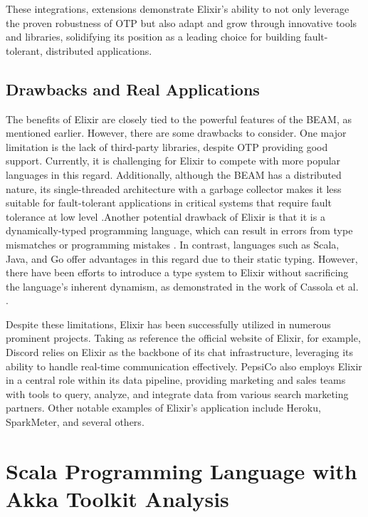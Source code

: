 These integrations, extensions  demonstrate Elixir’s ability to not only leverage the proven robustness of \gls{OTP} but also adapt and grow through innovative tools and libraries, solidifying its position as a leading choice for building fault-tolerant, distributed applications.

\subsection{Drawbacks and Real Applications}

The benefits of Elixir are closely tied to the powerful features of the \gls{BEAM}, as mentioned earlier. However, there are some drawbacks to consider. One major limitation is the lack of third-party libraries, despite \gls{OTP} providing good support. Currently, it is challenging for Elixir to compete with more popular languages in this regard. Additionally, although the \gls{BEAM} has a distributed nature, its single-threaded architecture with a garbage collector makes it less suitable for fault-tolerant applications in critical systems that require fault tolerance at low level \cite{Juric2024}.Another potential drawback of Elixir is that it is a dynamically-typed programming language, which can result in errors from type mismatches or programming mistakes \cite{Cassola2020}. In contrast, languages such as Scala, Java, and Go offer advantages in this regard due to their static typing. However, there have been efforts to introduce a type system to Elixir without sacrificing the language's inherent dynamism, as demonstrated in the work of Cassola et al. \cite{Cassola2020}.

Despite these limitations, Elixir has been successfully utilized in numerous prominent projects. Taking as reference the official website of Elixir, for example, Discord relies on Elixir as the backbone of its chat infrastructure, leveraging its ability to handle real-time communication effectively. PepsiCo also employs Elixir in a central role within its data pipeline, providing marketing and sales teams with tools to query, analyze, and integrate data from various search marketing partners. Other notable examples of Elixir's application include Heroku, SparkMeter, and several others.

\section{Scala Programming Language with Akka Toolkit Analysis}

